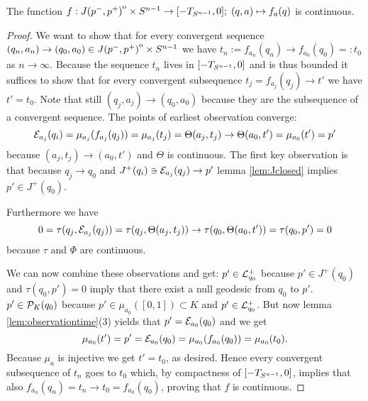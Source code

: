 


\begin{proposition}\label{prop:fcont} 
    The function $f:{\kern0ptJ(p^-,p^+)}^{\mathrm{o}}\times{S^{n-1}}\to[-T_{S^{n-1}},0];\; (q,a)\mapsto f_a(q)$ is continuous.
\end{proposition}
\begin{proof}
    We want to show that for every convergent sequence $(q_n,a_n)\to (q_0,a_0)\in {\kern0ptJ(p^-,p^+)}^{\mathrm{o}}\times {S^{n-1}}$ we have $t_n:=f_{a_n}(q_n)\to f_{a_0}(q_0)=:t_0$ as $n \to \infty$. Because the sequence $t_n$ lives in $[-T_{S^{n-1}},0]$ and is thus bounded it suffices to show that for every convergent subsequence $t_j = f_{a_j}(q_j) \to t'$ we have $t'=t_0$. Note that still $(q_j,a_j)\to (q_0,a_0)$ because they are the subsequence of a convergent sequence. The points of earliest observation converge:
    \[
        {\mathcal{E}}_{a_j}(q_i) = \mu_{a_j}(f_{a_j}(q_j)) = \mu_{a_j}(t_j) = \Theta(a_j,t_j) \to \Theta(a_0,t') = \mu_{a_0}(t')=p'
    \] because $(a_j,t_j)\to (a_0,t')$ and $\Theta$ is continuous.
    The first key observation is that  because $q_j\to q_0$ and $J^+(q_i)\ni{\mathcal{E}}_{a_j}(q_j) \to  p'$ lemma \ref{lem:Jclosed} implies $p'\in J^+(q_0)$.

    Furthermore we have
    \[
        0=\tau(q_j,{\mathcal{E}}_{a_j}(q_j))=\tau(q_j,\Theta(a_j,t_j))\to \tau(q_0,\Theta(a_0,t')) = \tau(q_0,p')=0
    \] because $\tau$ and $\Phi$ are continuous.

    We can now combine these observations and get: $p'\in {\mathcal{L}}^+_{q_0}$ because $p'\in J^+(q_0)$ and $\tau(q_0,p')=0$ imply that there exist a null geodesic from $q_0$ to $p'$. $p'\in {\mathcal{P}}_K(q_0)$ because $p'\in \mu_{a_0}([0,1])\subset K$ and $p'\in {\mathcal{L}}^+_{q_0}$. But now lemma \ref{lem:observationtime}(3) yields that $p'={\mathcal{E}}_{a_0}(q_0)$ and we get 
    \[
        \mu_{a_0}(t') = p' = {\mathcal{E}}_{a_0}(q_0) = \mu_{a_0}(f_{a_0}(q_0))= \mu_{a_0}(t_0).
    \]
    Because $\mu_a$ is injective we get $t'=t_0$, as desired. Hence every convergent subsequence of $t_n$ goes to $t_0$ which, by compactness of $[-T_{S^{n-1}},0]$, implies that also $f_{a_n}(q_n)=t_n \to t_0 = f_{a_0}(q_0)$, proving that $f$ is continuous.
\end{proof}

